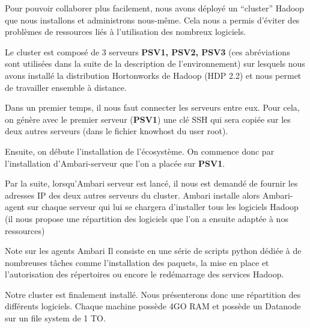 \par
Pour pouvoir collaborer plus facilement, nous avons déployé un “cluster” Hadoop que nous installons et administrons nous-même. Cela nous a permis d’éviter des problèmes de ressources liés à l’utilisation des nombreux logiciels.
\par
Le cluster est composé de 3 serveurs \textbf{PSV1, PSV2, PSV3} (ces abréviations sont utilisées dans la suite de la description de l'environnement) sur lesquels nous avons installé la distribution Hortonworks de Hadoop (HDP 2.2) et nous permet de travailler ensemble à distance.
\par
Dans un premier temps, il nous faut connecter les serveurs entre eux. Pour cela, on génère avec le premier serveur (\textbf{PSV1}) une clé SSH qui sera copiée sur les deux autres serveurs (dans le fichier knowhost du user root).
\par
Ensuite, on débute l’installation de l’écosystème. On commence donc par l’installation d’Ambari-serveur que l’on a placée sur \textbf{PSV1}.
\par
Par la suite, lorsqu’Ambari serveur est lancé, il nous est demandé de fournir les adresses IP des deux autres serveurs du cluster. Ambari installe alors Ambari-agent sur chaque serveur qui lui se chargera d’installer tous les logiciels Hadoop (il nous propose une répartition des logiciels que l’on a ensuite adaptée à nos ressources)   

\par
\begin{block}{Note sur les agents Ambari} Il consiste en une série de scripts python dédiée à de nombreuses tâches comme l’installation des paquets, la mise en place et l'autorisation des répertoires ou encore le redémarrage des services Hadoop. 
\end{block}
Notre cluster est finalement installé. Nous présenterons donc une répartition des différents logiciels. Chaque machine possède 4GO RAM et possède un Datanode sur un file system de 1 TO. \newline


